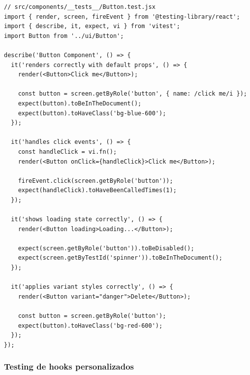 \documentclass[12pt,a4paper,oneside]{report}
\begin{document}
\begin{lstlisting}
// src/components/__tests__/Button.test.jsx
import { render, screen, fireEvent } from '@testing-library/react';
import { describe, it, expect, vi } from 'vitest';
import Button from '../ui/Button';

describe('Button Component', () => {
  it('renders correctly with default props', () => {
    render(<Button>Click me</Button>);
    
    const button = screen.getByRole('button', { name: /click me/i });
    expect(button).toBeInTheDocument();
    expect(button).toHaveClass('bg-blue-600');
  });

  it('handles click events', () => {
    const handleClick = vi.fn();
    render(<Button onClick={handleClick}>Click me</Button>);
    
    fireEvent.click(screen.getByRole('button'));
    expect(handleClick).toHaveBeenCalledTimes(1);
  });

  it('shows loading state correctly', () => {
    render(<Button loading>Loading...</Button>);
    
    expect(screen.getByRole('button')).toBeDisabled();
    expect(screen.getByTestId('spinner')).toBeInTheDocument();
  });

  it('applies variant styles correctly', () => {
    render(<Button variant="danger">Delete</Button>);
    
    const button = screen.getByRole('button');
    expect(button).toHaveClass('bg-red-600');
  });
});
\end{lstlisting}

\subsubsection{Testing de hooks
personalizados}\label{testing-de-hooks-personalizados}
\end{document}

